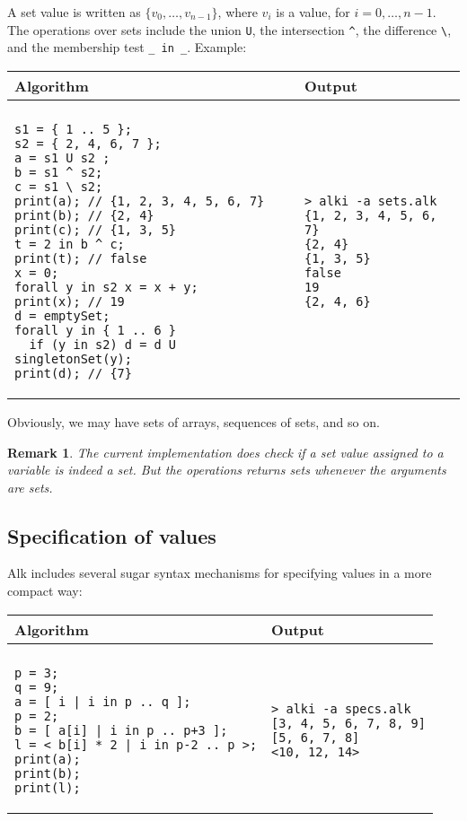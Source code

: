 \documentclass[a4paper]{report}
\newtheorem*{remark}{Remark}
\begin{document}
A set value is written as $\{ v_0,\ldots,v_{n-1}\}$, where $v_i$ is a value, for $i=0,\ldots,n-1$. The operations over sets include the union \verb|U|, the intersection \verb|^|, the difference \verb|\|, and the membership test \verb|_ in _|.
Example:
\begin{center}
\begin{tabular}{ll}
Algorithm & Output\\
\hline
\\
\begin{minipage}{.55\textwidth}
\begin{verbatim}
s1 = { 1 .. 5 };
s2 = { 2, 4, 6, 7 };
a = s1 U s2 ;
b = s1 ^ s2;
c = s1 \ s2;
print(a); // {1, 2, 3, 4, 5, 6, 7}
print(b); // {2, 4}
print(c); // {1, 3, 5}
t = 2 in b ^ c;
print(t); // false
x = 0;
forall y in s2 x = x + y;
print(x); // 19
d = emptySet;
forall y in { 1 .. 6 }
  if (y in s2) d = d U singletonSet(y);
print(d); // {7}
\end{verbatim}
\end{minipage}
&
\begin{minipage}{.45\textwidth}
\begin{verbatim}
> alki -a sets.alk 
{1, 2, 3, 4, 5, 6, 7}
{2, 4}
{1, 3, 5}
false
19
{2, 4, 6}
\end{verbatim}
\end{minipage}
\end{tabular}
\end{center}

Obviously, we may have sets of arrays, sequences of sets, and so on.

\begin{remark}
The current implementation does check if a set value assigned to a variable is indeed a set. But the operations returns sets whenever the arguments are sets.
\end{remark}

\subsection{Specification of values}

Alk includes several sugar syntax mechanisms for specifying values in a more compact way:
\begin{center}
\begin{tabular}{ll}
Algorithm & Output\\
\hline
\\
\begin{minipage}{.45\textwidth}
\begin{verbatim}
p = 3;
q = 9;
a = [ i | i in p .. q ];
p = 2;
b = [ a[i] | i in p .. p+3 ];
l = < b[i] * 2 | i in p-2 .. p >;
print(a);
print(b);
print(l);
\end{verbatim}
\end{minipage}
&
\begin{minipage}{.45\textwidth}
\begin{verbatim}
> alki -a specs.alk 
[3, 4, 5, 6, 7, 8, 9]
[5, 6, 7, 8]
<10, 12, 14>
\end{verbatim}
\end{minipage}
\end{tabular}
\end{center}
\end{document}
